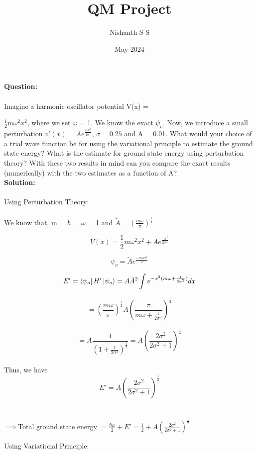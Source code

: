 \documentclass[12pt]{article}
\title{QM Project}
\author{Nishanth S S}
\date{May 2024}
\begin{document}
\maketitle

\noindent
\textbf{Question:}
\\
\\
Imagine a harmonic oscillator potential V(x) = 

$\frac{1}{2}$m$\omega^2 x^{2}$, where we 
set $\omega$ = 1. We know the exact $\psi_o$. Now, we introduce a small perturbation 
$v'(x) = A e^\frac{-x^2}{2\sigma^2}$,  $\sigma = 0.25$ and A = 0.01. What would your 
choice of a trial wave function be for using the variational principle to estimate 
the ground state energy? What is the estimate for ground state energy using perturbation 
theory? With these two results in mind can you compare the exact results 
(numerically) with the two estimates as a function of A? 
\\

\noindent
\textbf{Solution:}
\\
\\
Using Perturbation Theory:
\\
\\
We know that, m = $\hbar$ = $\omega$ = 1 and $\tilde{A} = (\frac{m \omega}{\pi})^\frac{1}{4}$

\[ V(x) = \frac{1}{2}m\omega^2 x^{2} + A e^{\frac{-x^2}{2\sigma^2}} \]

\[ \psi_o = \tilde{A} e^{\frac{-m \omega x^2}{2}} \]

\[ E' = \bra{\psi_o} H' \ket{\psi_o} = A\tilde{A}^2 \int e^{-x^2(m \omega + \frac{1}{2 \sigma^2})}  dx \]

\[ = (\frac{m \omega}{\pi})^\frac{1}{2} A (\frac{\pi}{m \omega + \frac{1}{2 \sigma^2}})^\frac{1}{2}\]

\[ = A \frac{1}{(1 + \frac{1}{2 \sigma^2})^\frac{1}{2}} = A (\frac{2 \sigma^2}{2 \sigma^2 + 1})^\frac{1}{2}\]
\\
Thus, we have 
\begin{equation}
	E' = A (\frac{2 \sigma^2}{2 \sigma^2 + 1})^\frac{1}{2}
\end{equation}
\\
\\
\( \implies \)Total ground state energy $= \frac{\hbar \omega}{2} + E' = \frac{1}{2} + A (\frac{2 \sigma^2}{2 \sigma^2 + 1})^\frac{1}{2} $

\vspace{2 cm}

\newpage
Using Variational Principle:
\end{document}

